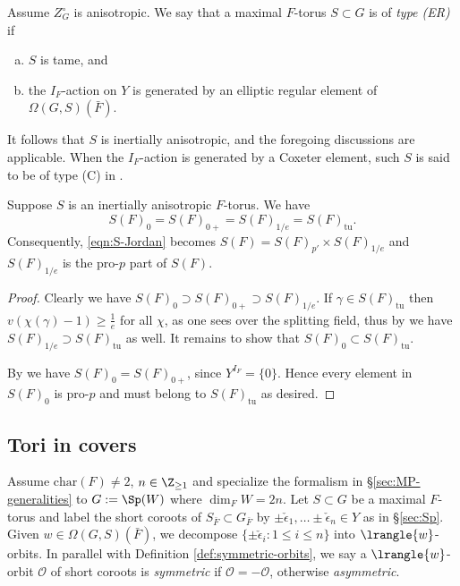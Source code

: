 \documentclass[a4paper,10pt]{article}
\begin{document}
\begin{definition}\label{def:type-ER} 
	Assume $Z_G^\circ$ is anisotropic. We say that a maximal $F$-torus $S \subset G$ is of \emph{type (ER)} if
	\begin{enumerate}[(a)]
		\item $S$ is tame, and
		\item the $I_F$-action on $Y$ is generated by an elliptic regular element of $\Omega(G,S)(\bar{F})$.
	\end{enumerate}
	It follows that $S$ is inertially anisotropic, and the foregoing discussions are applicable. When the $I_F$-action is generated by a Coxeter element, such $S$ is said to be of type (C) in \cite{Kal13}.
\end{definition}

\begin{lemma}\label{prop:S_0}
	Suppose $S$ is an inertially anisotropic $F$-torus. We have
	\[ S(F)_0 = S(F)_{0+} = S(F)_{1/e} = S(F)_\mathrm{tu}. \]
	Consequently, \eqref{eqn:S-Jordan} becomes $S(F) = S(F)_{p'} \times S(F)_{1/e}$ and $S(F)_{1/e}$ is the pro-$p$ part of $S(F)$.
\end{lemma}
\begin{proof}
	Clearly we have $S(F)_0 \supset S(F)_{0+} \supset S(F)_{1/e}$. If $\gamma \in S(F)_\text{tu}$ then $v(\chi(\gamma)-1) \geq \frac{1}{e}$ for all $\chi$, as one sees over the splitting field, thus by \cite[(3.1)]{Kal16} we have $S(F)_{1/e} \supset S(F)_\text{tu}$ as well. It remains to show that $S(F)_0 \subset S(F)_{\text{tu}}$.
	
	By \cite[Lemma 3.1.3]{Kal16} we have $S(F)_0 = S(F)_{0+}$, since $Y^{I_F} = \{0\}$. Hence every element in $S(F)_0$ is pro-$p$ and must belong to $S(F)_\text{tu}$ as desired.
\end{proof}

\subsection{Tori in covers}\label{sec:covers-tori}
Assume $\text{char}(F) \neq 2$, $n \in \Z_{\geq 1}$ and specialize the formalism in \S\ref{sec:MP-generalities} to $G := \Sp(W)$ where $\dim_F W = 2n$. Let $S \subset G$ be a maximal $F$-torus and label the short coroots of $S_{\bar{F}} \subset G_{\bar{F}}$ by $\pm\check{\epsilon}_1, \ldots \pm\check{\epsilon}_n \in Y$ as in \S\ref{sec:Sp}. Given $w \in \Omega(G, S)(\bar{F})$, we decompose $\{ \pm\check{\epsilon}_i : 1 \leq i \leq n\}$ into $\lrangle{w}$-orbits. In parallel with Definition \ref{def:symmetric-orbits}, we say a $\lrangle{w}$-orbit $\mathcal{O}$ of short coroots is \emph{symmetric} if $\mathcal{O} = -\mathcal{O}$, otherwise \emph{asymmetric}.
\end{document}
